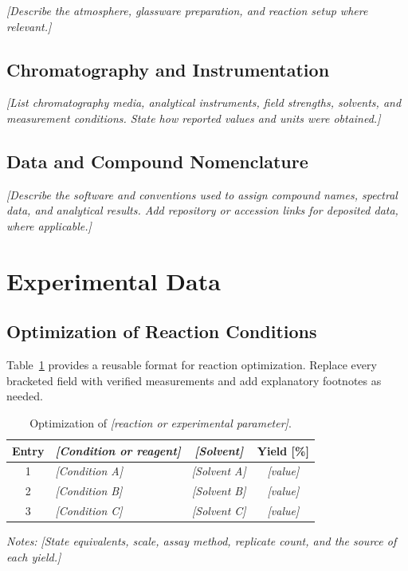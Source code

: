 \documentclass[11pt,a4paper,oneside]{article}
\newcommand{\placeholder}[1]{\textit{[#1]}}
\begin{document}
\placeholder{Describe the atmosphere, glassware preparation, and reaction setup where relevant.}

\subsection{Chromatography and Instrumentation}
\placeholder{List chromatography media, analytical instruments, field strengths, solvents, and measurement conditions. State how reported values and units were obtained.}

\subsection{Data and Compound Nomenclature}
\placeholder{Describe the software and conventions used to assign compound names, spectral data, and analytical results. Add repository or accession links for deposited data, where applicable.}

\section{Experimental Data}

\subsection{Optimization of Reaction Conditions}
Table~\ref{tab:optimization} provides a reusable format for reaction optimization. Replace every bracketed field with verified measurements and add explanatory footnotes as needed.

\begin{table}[htbp]
  \centering
  \caption{Optimization of \placeholder{reaction or experimental parameter}.}
  \label{tab:optimization}
  \small
  \begin{tabularx}{\linewidth}{@{}c X c c@{}}
    \toprule
    Entry & \placeholder{Condition or reagent} & \placeholder{Solvent} & Yield [\%] \\
    \midrule
    1 & \placeholder{Condition A} & \placeholder{Solvent A} & \placeholder{value} \\
    2 & \placeholder{Condition B} & \placeholder{Solvent B} & \placeholder{value} \\
    3 & \placeholder{Condition C} & \placeholder{Solvent C} & \placeholder{value} \\
    \bottomrule
  \end{tabularx}

  \vspace{4pt}
  \begin{minipage}{0.96\linewidth}
    \footnotesize
    \textit{Notes:} \placeholder{State equivalents, scale, assay method, replicate count, and the source of each yield.}
  \end{minipage}
\end{table}
\end{document}
